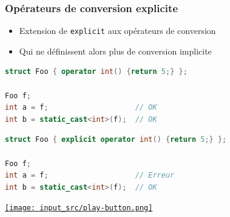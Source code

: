 \documentclass[C++.tex]{subfiles}
\begin{document}
\begin{frame}[fragile]
	\frametitle{Opérateurs de conversion explicite}
	\begin{itemize}
		\item Extension de \lstinline|explicit| aux opérateurs de conversion
		\item Qui ne définissent alors plus de conversion implicite
	\end{itemize}

	\begin{lstlisting}[language=C++]
struct Foo { operator int() {return 5;} };

Foo f;
int a = f;	                  // OK
int b = static_cast<int>(f);  // OK\end{lstlisting}

	\begin{lstlisting}[language=C++]
struct Foo { explicit operator int() {return 5;} };

Foo f;
int a = f;	                  // Erreur
int b = static_cast<int>(f);  // OK\end{lstlisting}

	\hfill
	\href{https://godbolt.org/#g:!((g:!((g:!((h:codeEditor,i:(filename:'1',fontScale:14,fontUsePx:'0',j:1,lang:c%2B%2B,selection:(endColumn:1,endLineNumber:39,positionColumn:1,positionLineNumber:39,selectionStartColumn:1,selectionStartLineNumber:39,startColumn:1,startLineNumber:39),source:'%23include+%3Ciostream%3E%0A%23include+%3Cstring%3E%0A%0Astruct+Foo%0A%7B%0A++operator+int()%0A++%7B%0A++++return+5%3B%0A++%7D%0A%7D%3B%0A%0A%0Astruct+Bar%0A%7B%0A++explicit+operator+int()%0A++%7B%0A++++return+5%3B%0A++%7D%0A%7D%3B%0A%0Aint+main()%0A%7B%0A++%7B%0A++++Foo+f%3B%0A++++int+a+%3D+f%3B%0A++++int+b+%3D+static_cast%3Cint%3E(f)%3B%0A++++std::cout+%3C%3C+a+%3C%3C+!'+!'+%3C%3C+b+%3C%3C+!'%5Cn!'%3B%0A++%7D%0A%0A++%7B%0A++++Bar+f%3B%0A%23if+1%0A++++int+a+%3D+f%3B%0A%23endif%0A++++int+b+%3D+static_cast%3Cint%3E(f)%3B%0A++++std::cout+%3C%3C+b+%3C%3C+!'%5Cn!'%3B%0A++%7D%0A%7D%0A'),l:'5',n:'0',o:'C%2B%2B+source+%231',t:'0')),k:50,l:'4',n:'0',o:'',s:0,t:'0'),(g:!((h:executor,i:(argsPanelShown:'1',compilationPanelShown:'0',compiler:g112,compilerOutShown:'0',execArgs:'',execStdin:'',fontScale:14,fontUsePx:'0',j:1,lang:c%2B%2B,libs:!((name:boost,ver:'175')),options:'-std%3Dc%2B%2B11',source:1,stdinPanelShown:'1',tree:'1',wrap:'0'),l:'5',n:'0',o:'Executor+x86-64+gcc+11.2+(C%2B%2B,+Editor+%231)',t:'0')),header:(),k:50,l:'4',n:'0',o:'',s:0,t:'0')),l:'2',n:'0',o:'',t:'0')),version:4}{\texttt{[image: input\_src/play-button.png]}}
\end{frame}
\end{document}
